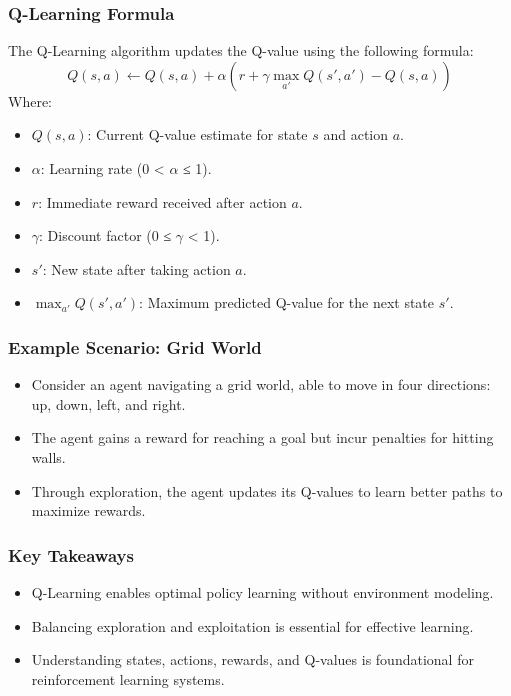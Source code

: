 \documentclass[aspectratio=169]{beamer}
\begin{document}
\begin{frame}[fragile]
    \frametitle{Q-Learning Formula}
    The Q-Learning algorithm updates the Q-value using the following formula:
    \begin{equation}
    Q(s, a) \leftarrow Q(s, a) + \alpha \left( r + \gamma \max_{a'} Q(s', a') - Q(s, a) \right)
    \end{equation}
    Where:
    \begin{itemize}
        \item \(Q(s, a)\): Current Q-value estimate for state \(s\) and action \(a\).
        \item \(\alpha\): Learning rate (0 < \( \alpha \) ≤ 1).
        \item \(r\): Immediate reward received after action \(a\).
        \item \(\gamma\): Discount factor (0 ≤ \( \gamma \) < 1).
        \item \(s'\): New state after taking action \(a\).
        \item \(\max_{a'} Q(s', a')\): Maximum predicted Q-value for the next state \(s'\).
    \end{itemize}
\end{frame}

\begin{frame}[fragile]
    \frametitle{Example Scenario: Grid World}
    \begin{itemize}
        \item Consider an agent navigating a grid world, able to move in four directions: up, down, left, and right.
        \item The agent gains a reward for reaching a goal but incur penalties for hitting walls.
        \item Through exploration, the agent updates its Q-values to learn better paths to maximize rewards.
    \end{itemize}
\end{frame}

\begin{frame}[fragile]
    \frametitle{Key Takeaways}
    \begin{itemize}
        \item Q-Learning enables optimal policy learning without environment modeling.
        \item Balancing exploration and exploitation is essential for effective learning.
        \item Understanding states, actions, rewards, and Q-values is foundational for reinforcement learning systems.
    \end{itemize}
\end{frame}
\end{document}
